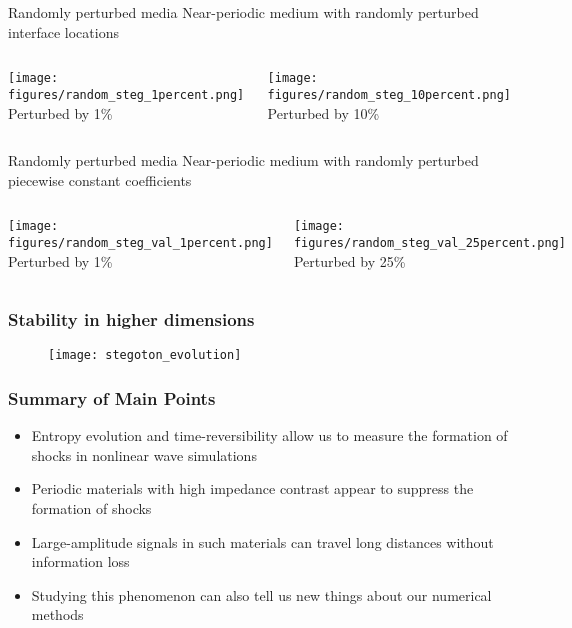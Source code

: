 \documentclass[xcolor=pst,dvipsnames]{beamer}
\begin{document}
\begin{frame}{Randomly perturbed media}
  Near-periodic medium with randomly perturbed interface locations 
\begin{columns}
  \column{5cm}
  \begin{center}  \texttt{[image: figures/random\_steg\_1percent.png]}\\
  Perturbed by 1\%
  \end{center}
  \column{5cm}
  \begin{center}  \texttt{[image: figures/random\_steg\_10percent.png]} \\
  Perturbed by 10\%\end{center}
\end{columns}
\end{frame}

\begin{frame}{Randomly perturbed media}
  Near-periodic medium with randomly perturbed piecewise constant coefficients 
\begin{columns}
  \column{5cm}
  \begin{center}  \texttt{[image: figures/random\_steg\_val\_1percent.png]}\\
  Perturbed by 1\%
  \end{center}
  \column{5cm}
  \begin{center}  \texttt{[image: figures/random\_steg\_val\_25percent.png]} \\
  Perturbed by 25\%\end{center}
\end{columns}
\end{frame}


\begin{frame} \frametitle{Stability in higher dimensions}
\begin{figure} \texttt{[image: stegoton\_evolution]} \end{figure}
\end{frame}


\begin{frame} \frametitle{Summary of Main Points}
\begin{itemize}
  \item Entropy evolution and time-reversibility allow us to measure the
        formation of shocks in nonlinear wave simulations
  \item Periodic materials with high impedance contrast appear to 
        suppress the formation of shocks
  \item Large-amplitude signals in such materials can travel long
        distances without information loss
  \item Studying this phenomenon can also tell us new things about our
        numerical methods
\end{itemize}
\end{frame}
\end{document}
